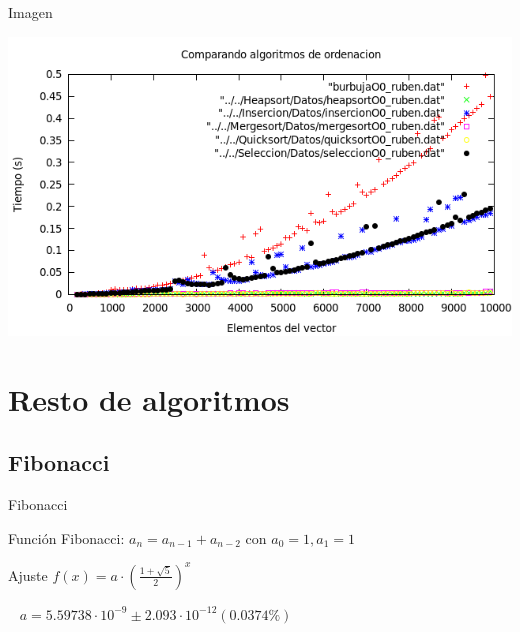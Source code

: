 \documentclass[compress]{beamer}
\begin{document}
\begin{frame}
	\begin{alertblock}{Imagen}
	\begin{center}
	\includegraphics[scale=0.45]{../Graficas/todos.png}
	\end{center}
	\end{alertblock}
\end{frame}




\section{Resto de algoritmos}
\subsection{Fibonacci}
\begin{frame}{Fibonacci}
	\begin{block}{Función}
		Fibonacci: $a_n=a_{n-1} + a_{n-2}$ con $a_0=1, a_1=1$
	\end{block}
	
	\begin{block}{Ajuste}
	$ f(x) = a\cdot   \left( \displaystyle\frac{1+\sqrt5}{2} \right)^x $

	{\ }
	$a               = 5.59738\cdot 10^{-9}      \pm 2.093\cdot 10^{-12}    (0.0374\%)$
	\end{block}
\end{frame}
\end{document}
